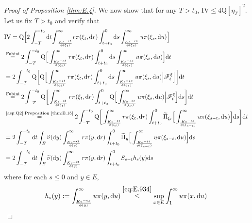 \documentclass[12pt,a4paper]{amsart}
\numberwithin{equation}{section}
\theoremstyle{plain}
\theoremstyle{definition}
\theoremstyle{remark}
\begin{document}
\begin{proof}[Proof of Proposition \ref{thm:E.4}]
We now show that
	for any $T>t_0$, $\text{IV} \leq 4 \mathrm Q[\eta_T]^2$.
	Let us fix $T>t_0$ and verify that
\begin{align}
	&\text{IV}
	= \mathrm Q\Big[ 2\int_{-T}^{-t_0} \mathrm dt  \mathrm \int_{\frac{Ke^{-\epsilon t}}{\phi(\xi_t)}}^\infty r \pi(\xi_t, \mathrm dr) \int_{t+t_0}^0\mathrm ds\int_{\frac{Ke^{-\epsilon s}}{\phi(\xi_s)}}^\infty u \pi(\xi_s, \mathrm du) \Big]
	\\&\overset{\text{Fubini}}= 2\int_{-T}^{-t_0}\mathrm Q\Big[\int_{\frac{Ke^{-\epsilon t}}{\phi(\xi_t)}}^\infty r \pi(\xi_t, \mathrm dr) \int_{t+t_0}^0\mathrm ds\int_{\frac{Ke^{-\epsilon s}}{\phi(\xi_s)}}^\infty u \pi(\xi_s, \mathrm du) \Big] \mathrm dt
	\\ & = 2\int_{-T}^{-t_0}\mathrm Q \bigg[ \mathrm Q\Big[\int_{\frac{Ke^{-\epsilon t}}{\phi(\xi_t)}}^\infty r \pi(\xi_t, \mathrm dr) \int_{t+t_0}^0\mathrm ds\int_{\frac{Ke^{-\epsilon s}}{\phi(\xi_s)}}^\infty u \pi(\xi_s, \mathrm du) \Big| \mathscr F_t^\xi \Big] \bigg]\mathrm dt
	\\ & \overset{\text{Fubini}} = 2\int_{-T}^{-t_0}\mathrm Q \bigg[ \int_{\frac{Ke^{-\epsilon t}}{\phi(\xi_t)}}^\infty r \pi(\xi_t, \mathrm dr) \int_{t+t_0}^0  \mathrm Q\Big[\int_{\frac{Ke^{-\epsilon s}}{\phi(\xi_s)}}^\infty u \pi(\xi_s, \mathrm du) \Big| \mathscr F_t^\xi \Big] \mathrm ds \bigg]\mathrm dt
	\\ & \overset{\text{\eqref{asp:Q2},Proposition \ref{thm:E.15}}} = 2\int_{-T}^{-t_0}\mathrm Q \bigg[ \int_{\frac{Ke^{-\epsilon t}}{\phi(\xi_t)}}^\infty r \pi(\xi_t, \mathrm dr) \int_{t+t_0}^0  \widetilde \Pi_{\xi_t}\Big[\int_{\frac{Ke^{-\epsilon s}}{\phi(\xi_{s-t})}}^\infty u \pi(\xi_{s-t}, \mathrm du) \Big] \mathrm ds \bigg]\mathrm dt
	\\&= 2\int_{-T}^{-t_0}\mathrm dt\int_E\widetilde \nu(\mathrm dy)\int_{\frac{Ke^{-\epsilon t}}{\phi(y)}}^\infty r \pi(y, \mathrm dr) \int_{t+t_0}^0 \widetilde\Pi_y\Big[\int_{\frac{Ke^{-\epsilon s}}{\phi(\xi_{s-t})}}^\infty u \pi(\xi_{s-t},\mathrm du)\Big] \mathrm ds
	\\\label{eq:E.938}&= 2\int_{-T}^{-t_0}\mathrm dt\int_E\widetilde \nu(\mathrm dy)\int_{\frac{Ke^{-\epsilon t}}{\phi(y)}}^\infty r \pi(y, \mathrm dr) \int_{t+t_0}^0 S_{s-t}h_s (y) \mathrm ds
\end{align}	
	where for each $s\leq 0$ and $y\in E$,
\begin{equation} \label{eq:E.939}
	h_s(y)
	:= \int_{\frac{Ke^{-\epsilon s}}{\phi(y)}}^\infty u \pi(y,\mathrm du)
	\overset{\eqref{eq:E.934}}\leq \sup_{x\in E}\int_{1}^\infty u \pi(x,\mathrm du)

\end{equation}
\end{proof}
\end{document}

